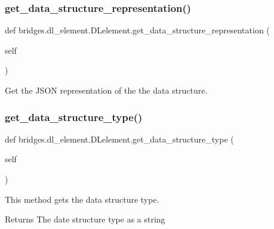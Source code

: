 \subsubsection{\texorpdfstring{get\+\_\+data\+\_\+structure\+\_\+representation()}{get\_data\_structure\_representation()}}
{\footnotesize\ttfamily def bridges.\+dl\+\_\+element.\+D\+Lelement.\+get\+\_\+data\+\_\+structure\+\_\+representation (\begin{DoxyParamCaption}\item[{}]{self }\end{DoxyParamCaption})}



Get the J\+S\+ON representation of the the data structure. 

\mbox{\label{classbridges_1_1dl__element_1_1_d_lelement_a5fb177ed67b75e606ac303f7a972d301}} 
\subsubsection{\texorpdfstring{get\+\_\+data\+\_\+structure\+\_\+type()}{get\_data\_structure\_type()}}
{\footnotesize\ttfamily def bridges.\+dl\+\_\+element.\+D\+Lelement.\+get\+\_\+data\+\_\+structure\+\_\+type (\begin{DoxyParamCaption}\item[{}]{self }\end{DoxyParamCaption})}



This method gets the data structure type. 

\begin{DoxyReturn}{Returns}
The date structure type as a string 
\end{DoxyReturn}
\mbox{\label{classbridges_1_1dl__element_1_1_d_lelement_a268ae3965f0cba4a801e73f61b7c9fcc}} 
